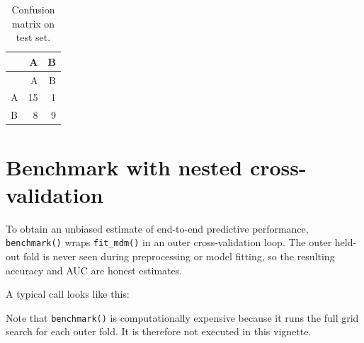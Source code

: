 \documentclass[
]{article}
\newenvironment{Shaded}{\begin{snugshade}}{\end{snugshade}}
\newcommand{\CharTok}[1]{\textcolor[rgb]{0.31,0.60,0.02}{#1}}
\newcommand{\CommentTok}[1]{\textcolor[rgb]{0.56,0.35,0.01}{\textit{#1}}}
\newcommand{\DataTypeTok}[1]{\textcolor[rgb]{0.13,0.29,0.53}{#1}}
\newcommand{\DecValTok}[1]{\textcolor[rgb]{0.00,0.00,0.81}{#1}}
\newcommand{\KeywordTok}[1]{\textcolor[rgb]{0.13,0.29,0.53}{\textbf{#1}}}
\newcommand{\NormalTok}[1]{#1}
\newcommand{\OperatorTok}[1]{\textcolor[rgb]{0.81,0.36,0.00}{\textbf{#1}}}
\newcommand{\StringTok}[1]{\textcolor[rgb]{0.31,0.60,0.02}{#1}}
\begin{document}
\begin{longtable}[]{@{}lrr@{}}
\caption{Confusion matrix on test set.}\tabularnewline
\toprule
& A & B\tabularnewline
\midrule
\endfirsthead
\toprule
& A & B\tabularnewline
\midrule
\endhead
A & 15 & 1\tabularnewline
B & 8 & 9\tabularnewline
\bottomrule
\end{longtable}

\hypertarget{benchmark-with-nested-cross-validation}{%
\section{Benchmark with nested
cross-validation}\label{benchmark-with-nested-cross-validation}}

To obtain an unbiased estimate of end-to-end predictive performance,
\texttt{benchmark()} wraps \texttt{fit\_mdm()} in an outer
cross-validation loop. The outer held-out fold is never seen during
preprocessing or model fitting, so the resulting accuracy and AUC are
honest estimates.

A typical call looks like this:

\begin{Shaded}
\end{Shaded}

Note that \texttt{benchmark()} is computationally expensive because it
runs the full grid search for each outer fold. It is therefore not
executed in this vignette.
\end{document}
